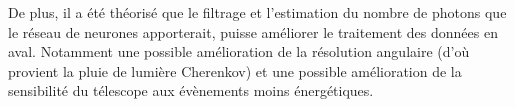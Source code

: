 De plus, il a été théorisé que le filtrage et l'estimation du nombre de photons que le réseau de neurones apporterait, puisse améliorer 
le traitement des données en aval. Notamment une possible amélioration de la résolution angulaire (d'où provient la pluie de lumière Cherenkov) et une possible amélioration de
la sensibilité du télescope aux évènements moins énergétiques.




